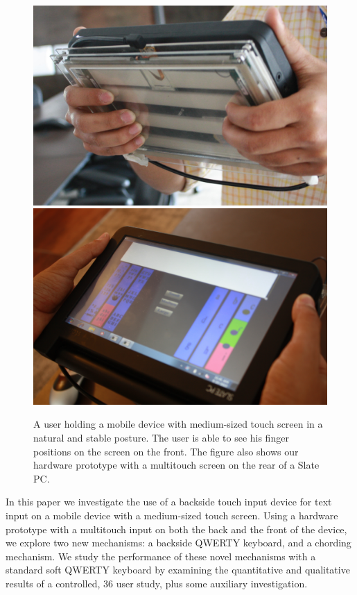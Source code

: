 \begin{figure}
    \includegraphics[scale=0.43]{Figures/natural1.pdf} 
     \includegraphics[scale=0.43]{Figures/natural2.pdf} 
     \caption{A user holding a mobile device with medium-sized touch
       screen in a natural and stable posture. The user is able to see
       his finger positions on the screen on the front. The figure
       also shows our hardware prototype with a multitouch screen on
       the rear of a Slate PC.}
        \label{fig:natural}
\end{figure}

In this paper we investigate the use of a backside touch input device
for text input on a mobile device with a medium-sized touch
screen. Using a hardware prototype with a multitouch input on both the
back and the front of the device, we explore two new mechanisms: a
backside QWERTY keyboard, and a chording mechanism.  We study the
performance of these novel mechanisms with a standard soft QWERTY
keyboard by examining the quantitative and qualitative results of a
controlled, 36 user study, plus some auxiliary investigation.
